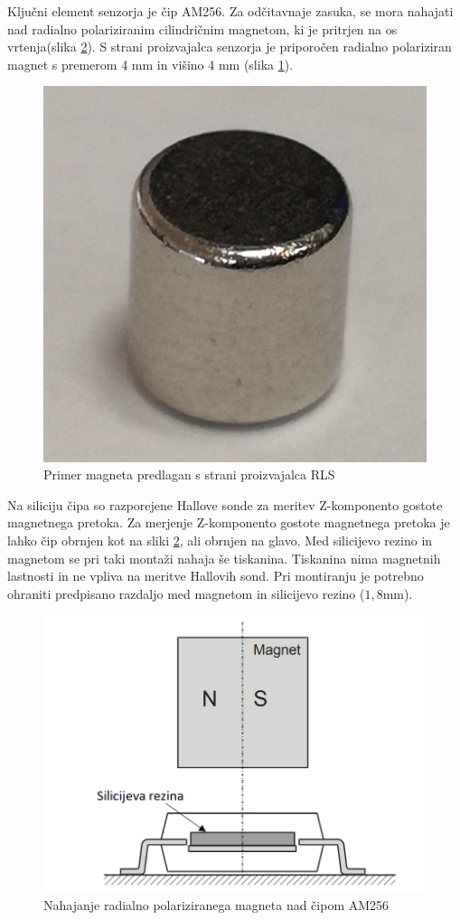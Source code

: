 Ključni element senzorja je čip AM256. Za odčitavnaje zasuka, se mora nahajati nad radialno polariziranim cilindričnim magnetom, ki je pritrjen na os vrtenja(slika \ref{stranski_ris}).
S strani proizvajalca senzorja je priporočen radialno polariziran magnet s premerom 4 mm in višino 4 mm (slika \ref{magnet4mm}).
\begin{figure}[h]
	\centering
	\includegraphics[width=0.35\columnwidth]{./Slike/magnet4mm.png}
	\caption{Primer magneta predlagan s strani proizvajalca RLS}
	\label{magnet4mm}
\end{figure}

Na siliciju čipa so razporejene Hallove sonde za meritev Z-komponento gostote magnetnega pretoka. Za merjenje Z-komponento gostote magnetnega pretoka je lahko čip obrnjen kot na sliki \ref{stranski_ris}, ali obrnjen na glavo. Med silicijevo rezino in magnetom se pri taki montaži nahaja še tiskanina. Tiskanina nima magnetnih lastnosti in ne vpliva na meritve Hallovih sond. Pri montiranju je potrebno ohraniti predpisano razdaljo med magnetom in silicijevo rezino ($1,8 \mathrm{mm}$).

\begin{figure}[h]
	\centering
	\includegraphics[width=0.5\columnwidth]{./Slike/stranski_ris.png}
	\caption{Nahajanje radialno polariziranega magneta nad čipom AM256 \cite{AM8192}}
	\label{stranski_ris}
\end{figure}

